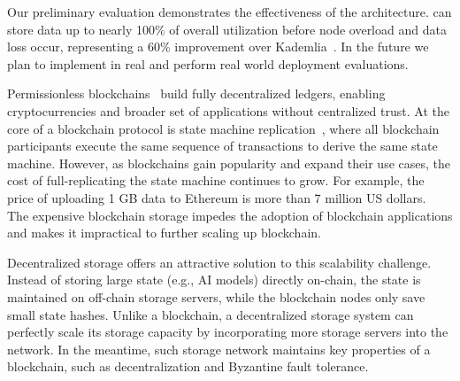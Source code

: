 Our preliminary evaluation demonstrates the effectiveness of the \dht architecture.
\dht can store data up to nearly 100\% of overall utilization before node overload and data loss occur, representing a 60\% improvement over Kademlia~\cite{maymounkov2002kademlia}.
In the future we plan to implement \dht in real and perform real world deployment evaluations.

\iffalse

Permissionless blockchains~\cite{bitcoin,ethereum} build fully decentralized ledgers, enabling cryptocurrencies and broader set of applications without centralized trust.
At the core of a blockchain protocol is state machine replication~\cite{smr}, where all blockchain participants execute the same sequence of transactions to derive the same state machine.
However, as blockchains gain popularity and expand their use cases, the cost of full-replicating the state machine continues to grow.
For example, the price of uploading 1 GB data to Ethereum is more than 7 million US dollars.~\cite{ethereum-cost}
The expensive blockchain storage impedes the adoption of blockchain applications and makes it impractical to further scaling up blockchain.


Decentralized storage offers an attractive solution to this scalability challenge.~\cite{storj2018storj, williams2019arweave, miller2014permacoin, EthStorage, filecoin, vorick2014sia, team2021swarm}
Instead of storing large state (e.g., AI models) directly on-chain, the state is maintained on off-chain storage servers, while the blockchain nodes only save small state hashes.
Unlike a blockchain, a decentralized storage system can perfectly scale its storage capacity by incorporating more storage servers into the network.
In the meantime, such storage network maintains key properties of a blockchain, such as decentralization and Byzantine fault tolerance.

